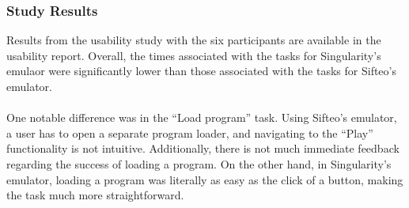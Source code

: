 \documentclass[12pt]{article}
\begin{document}
\subsubsection{Study Results}
Results from the usability study with the six participants are available in the usability report. Overall, the times associated with the tasks for Singularity's emulaor were significantly lower than those associated with the tasks for Sifteo's emulator.  \\\\
One notable difference was in the ``Load program'' task.  Using Sifteo's emulator, a user has to open a separate program loader, and navigating to the ``Play'' functionality is not intuitive.  Additionally, there is not much immediate feedback regarding the success of loading a program.  On the other hand, in Singularity's emulator, loading a program was literally as easy as the click of a button, making the task much more straightforward.
\end{document}
